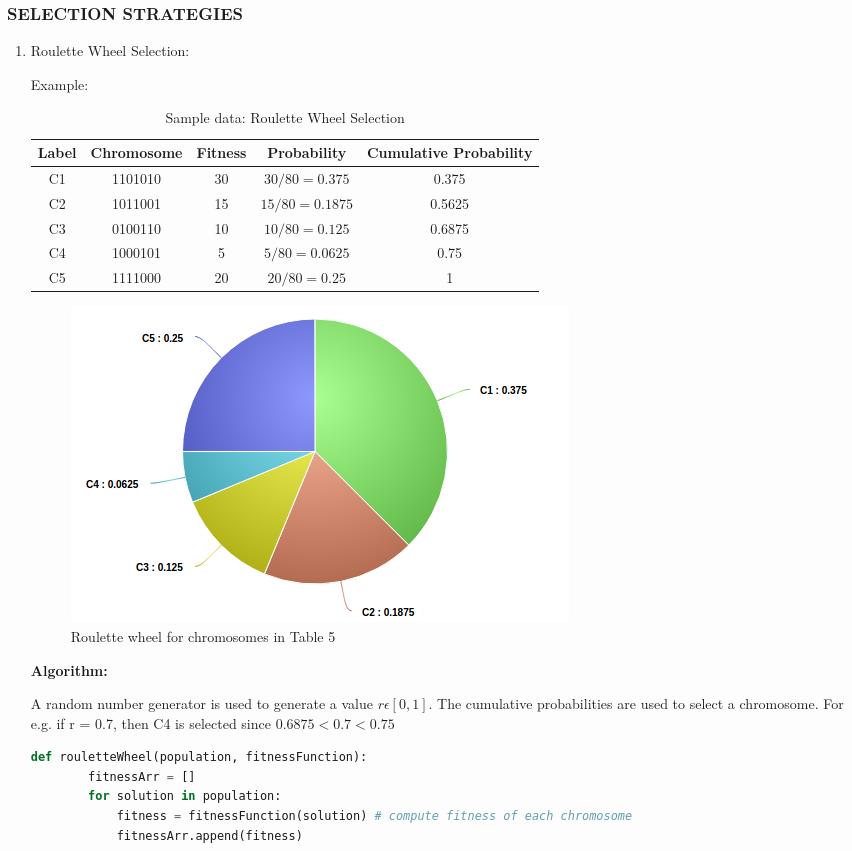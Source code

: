 \documentclass[12pt,a4paper]{article}
\begin{document}
	\subsubsection{SELECTION STRATEGIES}	
	\begin{enumerate}
	\item Roulette Wheel Selection: \par
	Example: \\
	\begin{table}[H]
		\centering
		\caption{Sample data: Roulette Wheel Selection}
		\begin{tabular}{ |c|c|c|c|c| }
		\hline
		Label & Chromosome & Fitness & Probability & Cumulative Probability \\
		\hline
		\hline
		C1 & 1101010 & 30 & $30/80=0.375$ & 0.375 \\
		\hline
		C2 & 1011001 & 15 & $15/80=0.1875$ & 0.5625 \\
		\hline
		C3 & 0100110 & 10 & $10/80=0.125$ & 0.6875 \\
		\hline
		C4 & 1000101 & 5 & $5/80=0.0625$ & 0.75 \\
		\hline
		C5 & 1111000 & 20 & $20/80=0.25$ & 1 \\
		\hline
		\end{tabular}
	\end{table}	
	
	\begin{figure}[h]
		\includegraphics[width=\textwidth]{roulette-pie}
		\caption{Roulette wheel for chromosomes in Table 5}
		\centering
	\end{figure}

	
	\textbf{Algorithm:}\par
	A random number generator is used to generate a value $r \epsilon [0,1]$. The cumulative probabilities are used to select a chromosome. For e.g. if r = 0.7, then C4 is selected since $0.6875 < 0.7 < 0.75$
	\vspace{5mm}
	\begin{lstlisting}[language=Python]
    def rouletteWheel(population, fitnessFunction):
        fitnessArr = []
        for solution in population:
            fitness = fitnessFunction(solution) # compute fitness of each chromosome
            fitnessArr.append(fitness)
        

\end{lstlisting}
\end{enumerate}
\end{document}
